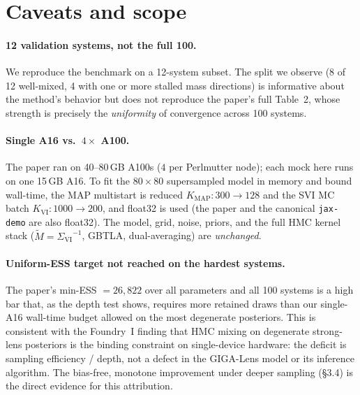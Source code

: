 \documentclass[11pt,letterpaper]{article}
\newcommand{\SigmaVI}{\ensuremath{\Sigma_{\mathrm{VI}}}}
\begin{document}
\section{Caveats and scope}

\paragraph{12 validation systems, not the full 100.} We reproduce the
benchmark on a 12-system subset. The split we observe (8 of 12 well-mixed,
4 with one or more stalled mass directions) is informative about the
method's behavior but does not reproduce the paper's full Table~2, whose
strength is precisely the \emph{uniformity} of convergence across 100
systems.

\paragraph{Single A16 vs.\ $4\times$ A100.} The paper ran on 40--80\,GB A100s
($4$ per Perlmutter node); each mock here runs on one 15\,GB A16. To fit the
$80\times80$ supersampled model in memory and bound wall-time, the MAP
multistart is reduced $K_{\mathrm{MAP}}\!:300\!\to\!128$ and the SVI MC batch
$K_{\mathrm{VI}}\!:1000\!\to\!200$, and float32 is used (the paper and the
canonical \texttt{jax-demo} are also float32). The model, grid, noise,
priors, and the full HMC kernel stack ($\tilde{M}=\SigmaVI^{-1}$, GBTLA,
dual-averaging) are \emph{unchanged}.

\paragraph{Uniform-ESS target not reached on the hardest systems.} The
paper's min-ESS $=26{,}822$ over all parameters and all 100 systems is a high
bar that, as the depth test shows, requires more retained draws than our
single-A16 wall-time budget allowed on the most degenerate posteriors. This
is consistent with the Foundry~I \citep{huang2025foundry1} finding that
HMC mixing on degenerate strong-lens posteriors is the binding constraint on
single-device hardware: the deficit is sampling efficiency / depth, not a
defect in the GIGA-Lens model or its inference algorithm. The bias-free,
monotone improvement under deeper sampling (\S3.4) is the direct evidence for
this attribution.
\end{document}

